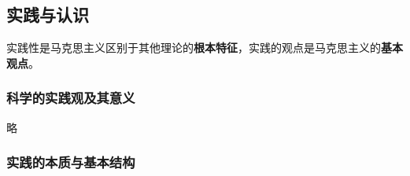 \documentclass[12pt, a4paper, oneside]{ctexart}
\begin{document}
\subsection{实践与认识}

实践性是马克思主义区别于其他理论的\textbf{根本特征}，实践的观点是马克思主义的\textbf{基本观点}。

\subsubsection{科学的实践观及其意义}

略

\subsubsection{实践的本质与基本结构}
\end{document}
